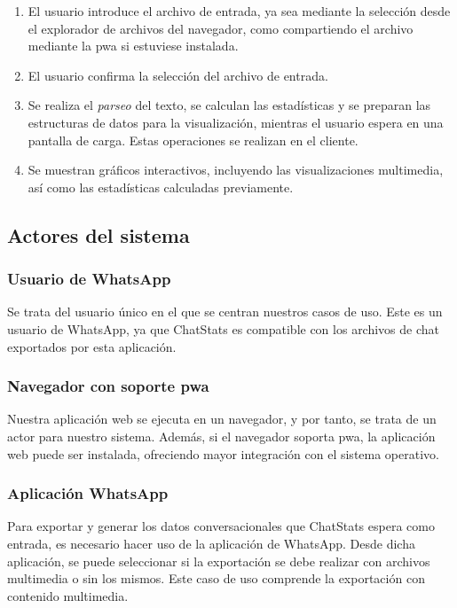 \begin{enumerate}
	\item El usuario introduce el archivo de entrada, ya sea mediante la selección desde el explorador de archivos del navegador, como compartiendo el archivo mediante la \acrshort{pwa} si estuviese instalada.
	\item El usuario confirma la selección del archivo de entrada.
	\item Se realiza el \textit{parseo} del texto, se calculan las estadísticas y se preparan las estructuras de datos para la visualización, mientras el usuario espera en una pantalla de carga. Estas operaciones se realizan en el cliente.
	\item Se muestran gráficos interactivos, incluyendo las visualizaciones multimedia, así como las estadísticas calculadas previamente.
\end{enumerate}

\subsection{Actores del sistema}
\label{subsec:system-actors}

\subsubsection{Usuario de WhatsApp}

Se trata del usuario único en el que se centran nuestros casos de uso. Este es un usuario de WhatsApp, ya que ChatStats es compatible con los archivos de chat exportados por esta aplicación.

\subsubsection{Navegador con soporte \acrfull{pwa}}

Nuestra aplicación web se ejecuta en un navegador, y por tanto, se trata de un actor para nuestro sistema. Además, si el navegador soporta \acrfull{pwa}, la aplicación web puede ser instalada, ofreciendo mayor integración con el sistema operativo.

\subsubsection{Aplicación WhatsApp}

Para exportar y generar los datos conversacionales que ChatStats espera como entrada, es necesario hacer uso de la aplicación de WhatsApp. Desde dicha aplicación, se puede seleccionar si la exportación se debe realizar con archivos multimedia o sin los mismos. Este caso de uso comprende la exportación con contenido multimedia.

